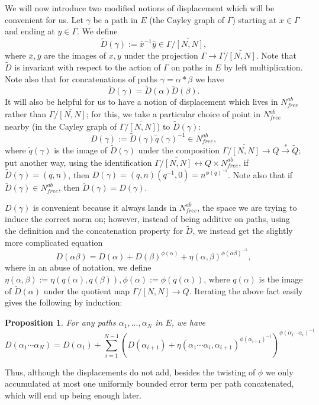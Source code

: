 \documentclass[12pt,reqno]{article}
\numberwithin{equation}{section}
\newtheorem{prop}{Proposition}
\begin{document}
We will now introduce two modified notions of displacement which will be convenient for us. Let $\gamma$ be a path in $E$ 
(the Cayley graph of $\Gamma$) starting at $x \in \Gamma$ and ending at $y \in \Gamma$. We define
\[ \tilde{D}(\gamma) := \bar{x}^{-1} \bar{y} \in \Gamma/\widetilde{[N,N]}, \]
where $\bar{x},\bar{y}$ are the images of $x,y$ under the projection $\Gamma \to \Gamma/\widetilde{[N,N]}$. Note that $\tilde{D}$ is invariant
with respect to the action of $\Gamma$ on paths in $E$ by left multiplication. Note also that for concatenations of paths 
$\gamma = \alpha * \beta$ we have
\[ \tilde{D}(\gamma) = \tilde{D}(\alpha) \tilde{D}(\beta). \]
It will also be helpful for us to have a notion of displacement which lives in $N^{ab}_{free}$ rather than $\Gamma/\widetilde{[N,N]}$; for this, we take
a particular choice of point in $N^{ab}_{free}$ nearby (in the Cayley graph of $\Gamma/\widetilde{[N,N]}$) to $\tilde{D}(\gamma)$:
\[ D(\gamma) := \tilde{D}(\gamma) \tilde{q}(\gamma)^{-1} \in N^{ab}_{free}, \]
where $\tilde{q}(\gamma)$ is the image of $\tilde{D}(\gamma)$ under the composition $\Gamma/\widetilde{[N,N]} \to Q \xrightarrow{s} \tilde{Q}$; 
put another way, using the identification $\Gamma/\widetilde{[N,N]} \leftrightarrow Q \times N^{ab}_{free}$, if $\tilde{D}(\gamma) = (q,n)$,
then $D(\gamma) = (q,n)(q^{-1},0) = n^{\phi(q)^{-1}}$. Note also that if $\tilde{D}(\gamma) \in N^{ab}_{free}$, 
then $\tilde{D}(\gamma) = D(\gamma)$.

$D(\gamma)$ is convenient because it always lands in $N^{ab}_{free}$, the space we are trying to induce the correct norm on; however,
instead of being additive on paths, using the definition and the concatenation property for $\tilde{D}$, we instead get the 
slightly more complicated equation
\begin{equation} \label{eq:noncommdisplacement}
   D(\alpha \beta) = D(\alpha) + D(\beta)^{\phi(\alpha)} + \eta(\alpha, \beta)^{\phi(\alpha \beta)^{-1}}, 
\end{equation}
where in an abuse of notation, we define $\eta(\alpha, \beta) := \eta(q(\alpha), q(\beta)), \phi(\alpha) := \phi(q(\alpha))$, where
$q(\alpha)$ is the image of $\tilde{D}(\alpha)$ under the quotient map $\Gamma/[N,N] \to Q$.
Iterating the above fact easily gives the following by induction:
\begin{prop} \label{noncommdisplacement}
For any paths $\alpha_1,...,\alpha_N$ in $E$, we have
\[ D(\alpha_1 \cdots \alpha_N) = 
D(\alpha_1) + \sum_{i=1}^{N-1} \left( D(\alpha_{i+1}) 
+ \eta(\alpha_1 \cdots \alpha_i, \alpha_{i+1})^{\phi(\alpha_{i+1})^{-1}} \right)^{\phi(\alpha_1 \cdots \alpha_i)^{-1}} \]
\end{prop}
Thus, although the displacements do not add, besides the twisting of $\phi$ we only accumulated at most one uniformly bounded
error term per path concatenated, which will end up being enough later.
\end{document}
